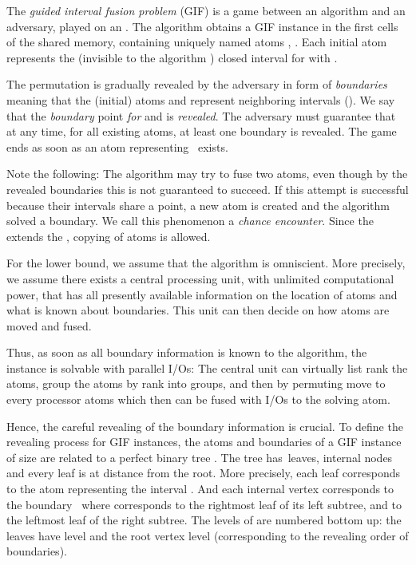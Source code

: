 \documentclass[envcountsame]{llncs}
\def\bO#1{\printmath{\mathcal{O}\left(#1\right)}}
\begin{document}
\begin{definition}
The \emph{guided interval fusion problem} (GIF) is a game between an algorithm and an adversary, played on an \fusePEM.
The algorithm obtains a GIF instance \gifInstance in the first  cells of the shared memory, containing  uniquely named atoms , .
Each initial atom  represents the (invisible to the algorithm ) closed interval  for  with .

The permutation  is gradually revealed by the adversary in form of \emph{boundaries}  meaning that the (initial) atoms  and  represent neighboring intervals ().
We say that the \emph{boundary} point  \emph{for}  and  is \emph{revealed}. The adversary must guarantee that at any time, for all existing atoms, at least one boundary is revealed.
The game ends as soon as an atom representing~ exists.
\end{definition}

Note the following: 
The algorithm may try to fuse two atoms, even though by the revealed boundaries this is not guaranteed to succeed.
If this attempt is successful because their intervals share a point, a new atom is created and the algorithm solved a boundary.
We call this phenomenon a \emph{chance encounter}.
Since the \fusePEM extends the \movePEM, copying of atoms is allowed.


For the lower bound, we assume that the algorithm is omniscient. More precisely, we assume there exists a central processing unit, with unlimited computational power, that has all presently available information on the location of atoms and what is known about boundaries. 
This unit can then decide on how atoms are moved and fused. 

Thus, as soon as all boundary information is known to the algorithm, the instance is solvable with \bO{\log \inputSize} parallel I/Os:
The central unit can virtually list rank the atoms, group the atoms by rank into  groups, and then by permuting move to every processor \bO{\memorySize} atoms which then can be fused with \bO{1} I/Os to the solving atom.



Hence, the careful revealing of the boundary information is crucial. 
To define the revealing process for GIF instances, the atoms and boundaries of a GIF instance \gifInstance of size  are related to a perfect binary tree \binaryTreeOf{\gifInstance}.
The tree \binaryTreeOf{\gifInstance} has~ leaves,  internal nodes and every leaf is at distance  from the root. 
More precisely, each leaf  corresponds to the atom representing the interval .
And each internal vertex  corresponds to the boundary~\mbox{} where  corresponds to the rightmost leaf of its left subtree, and  to the leftmost leaf of the right subtree.
The levels of \binaryTreeOf{\gifInstance} are numbered bottom up: the leaves have level  and the root vertex level  (corresponding to the revealing order of boundaries).
\end{document}
